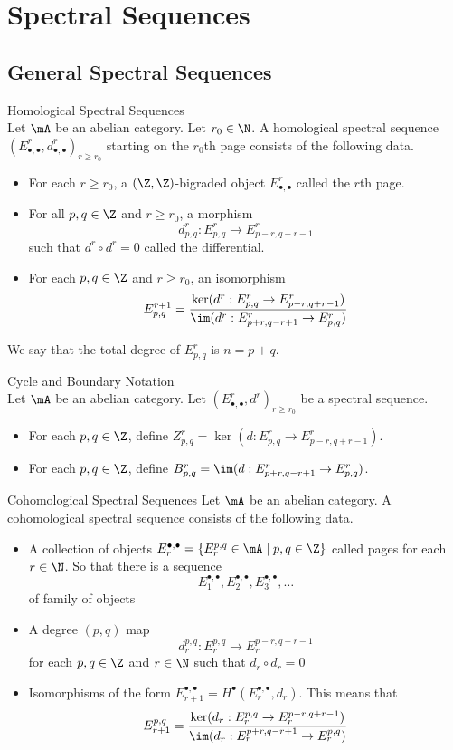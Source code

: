 \documentclass[a4paper]{article}
\begin{document}
\pagebreak
\section{Spectral Sequences}
\subsection{General Spectral Sequences}
\begin{defn}{Homological Spectral Sequences}{}\\
Let $\mA$ be an abelian category. Let $r_0\in\N$. A homological spectral sequence $(E_{\bullet,\bullet}^r,d_{\bullet,\bullet}^r)_{r\geq r_0}$ starting on the $r_0$th page consists of the following data.  
\begin{itemize}
\item For each $r\geq r_0$, a $(\Z,\Z)$-bigraded object $E_{\bullet,\bullet}^r$ called the $r$th page. 
\item For all $p,q\in\Z$ and $r\geq r_0$, a morphism $$d_{p,q}^r:E_{p,q}^r\to E_{p-r,q+r-1}^r$$ such that $d^r\circ d^r=0$ called the differential. 
\item For each $p,q\in\Z$ and $r\geq r_0$, an isomorphism $$E_{p,q}^{r+1}=\frac{\ker(d^r:E_{p,q}^r\to E_{p-r,q+r-1}^r)}{\im(d^r:E_{p+r,q-r+1}^r\to E_{p,q}^r)}$$
\end{itemize}
We say that the total degree of $E_{p,q}^r$ is $n=p+q$. 
\end{defn}

\begin{defn}{Cycle and Boundary Notation}{}\\
Let $\mA$ be an abelian category. Let $(E_{\bullet,\bullet}^r,d^r)_{r\geq r_0}$ be a spectral sequence. 
\begin{itemize}
\item For each $p,q\in\Z$, define $Z_{p,q}^r=\ker(d:E_{p,q}^r\to 
E_{p-r,q+r-1}^r)$. 
\item For each $p,q\in\Z$, define $B_{p,q}^r=\im(d:E_{p+r,q-r+1}^r\to E_{p,q}^r)$. 
\end{itemize}
\end{defn}

\begin{defn}{Cohomological Spectral Sequences}{} Let $\mA$ be an abelian category. A cohomological spectral sequence consists of the following data.  
\begin{itemize}
\item A collection of objects $E_r^{\bullet,\bullet}=\{E_r^{p,q}\in\mA\;|\;p,q\in\Z\}$ called pages for each $r\in\N$. So that there is a sequence $$E_1^{\bullet,\bullet},E_2^{\bullet,\bullet},E_3^{\bullet,\bullet},\dots$$ of family of objects
\item A degree $(p,q)$ map $$d_r^{p,q}:E_r^{p,q}\to E_r^{p-r,q+r-1}$$ for each $p,q\in\Z$ and $r\in\N$ such that $d_r\circ d_r=0$
\item Isomorphisms of the form $E_{r+1}^{\bullet,\bullet}=H^\bullet(E_r^{\bullet,\bullet},d_r)$. This means that $$E_{r+1}^{p,q}=\frac{\ker(d_r:E_r^{p,q}\to E_r^{p-r,q+r-1})}{\im(d_r:E_r^{p+r,q-r+1}\to E_r^{p,q})}$$
\end{itemize}
\end{defn}
\end{document}
